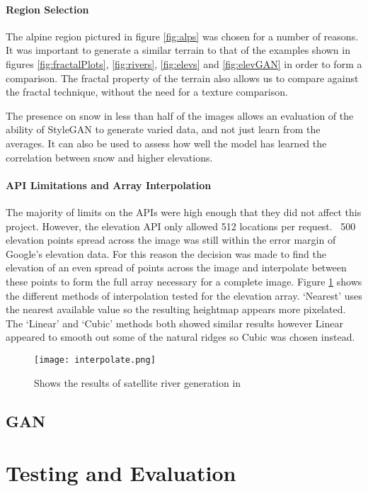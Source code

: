 \documentclass[a4paper]{report}
\begin{document}
\paragraph{Region Selection}
The alpine region pictured in figure \ref{fig:alps} was chosen for a number of reasons. It was important to generate a similar terrain to that of the examples shown in figures \ref{fig:fractalPlots}, \ref{fig:rivers}, \ref{fig:elevs} and \ref{fig:elevGAN} in order to form a comparison. The fractal property of the terrain also allows us to compare against the fractal technique, without the need for a texture comparison.

The presence on snow in less than half of the images allows an evaluation of the ability of StyleGAN to generate varied data, and not just learn from the averages. It can also be used to assess how well the model has learned the correlation between snow and higher elevations.
\paragraph{API Limitations and Array Interpolation}
The majority of limits on the APIs were high enough that they did not affect this project. However, the elevation API only allowed 512 locations per request. ~500 elevation points spread across the image was still within the error margin of Google's elevation data. For this reason the decision was made to find the elevation of an even spread of points across the image and interpolate between these points to form the full array necessary for a complete image. Figure \ref{fig:interpolate} shows the different methods of interpolation tested for the elevation array. `Nearest' uses the nearest available value so the resulting heightmap appears more pixelated. The `Linear' and `Cubic' methods both showed similar results however Linear appeared to smooth out some of the natural ridges so Cubic was chosen instead.

\begin{figure}[H]
    \centering
        \texttt{[image: interpolate.png]}
        \caption{Shows the results of satellite river generation in}
        \label{fig:interpolate}
\end{figure}
\subsection{GAN}
\section{Testing and Evaluation}
\end{document}
